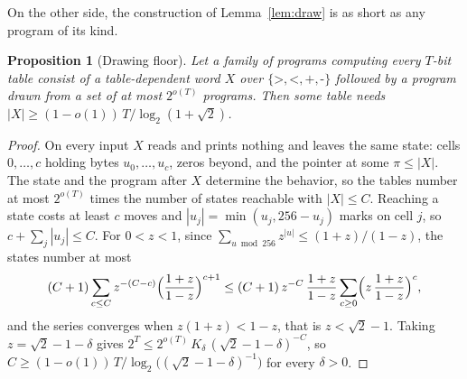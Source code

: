 \documentclass[11pt]{article}
\newtheorem{proposition}[theorem]{Proposition}
\theoremstyle{remark}
\begin{document}
On the other side, the construction of Lemma~\ref{lem:draw} is as short as
any program of its kind.

\begin{proposition}[Drawing floor]\label{prop:drawing}
Let a family of programs computing every $T$-bit table consist of a
table-dependent word $X$ over $\{\texttt{>},\texttt{<},\texttt{+},\texttt{-}\}$
followed by a program drawn from a set of at most $2^{o(T)}$ programs.  Then
some table needs $|X|\ge(1-o(1))\,T/\log_2(1+\sqrt2)$.
\end{proposition}

\begin{proof}
On every input $X$ reads and prints nothing and leaves the same state: cells
$0,\ldots,c$ holding bytes $u_0,\ldots,u_c$, zeros beyond, and the pointer
at some $\pi\le|X|$.  The state and the program after $X$ determine the
behavior, so the tables number at most $2^{o(T)}$ times the number of states
reachable with $|X|\le C$.  Reaching a state costs at least $c$ moves and
$|u_j|=\min(u_j,256-u_j)$ marks on cell $j$, so $c+\sum_j|u_j|\le C$.  For
$0<z<1$, since $\sum_{u\bmod256}z^{|u|}\le(1+z)/(1-z)$, the states number at
most
\[
  (C+1)\sum_{c\le C}z^{-(C-c)}\Bigl(\frac{1+z}{1-z}\Bigr)^{c+1}
  \le(C+1)\,z^{-C}\,\frac{1+z}{1-z}\sum_{c\ge0}\Bigl(z\,\frac{1+z}{1-z}\Bigr)^{c},
\]
and the series converges when $z(1+z)<1-z$, that is $z<\sqrt2-1$.  Taking
$z=\sqrt2-1-\delta$ gives $2^T\le2^{o(T)}\,K_\delta\,(\sqrt2-1-\delta)^{-C}$,
so $C\ge(1-o(1))\,T/\log_2\bigl((\sqrt2-1-\delta)^{-1}\bigr)$ for every
$\delta>0$.
\end{proof}
\end{document}
